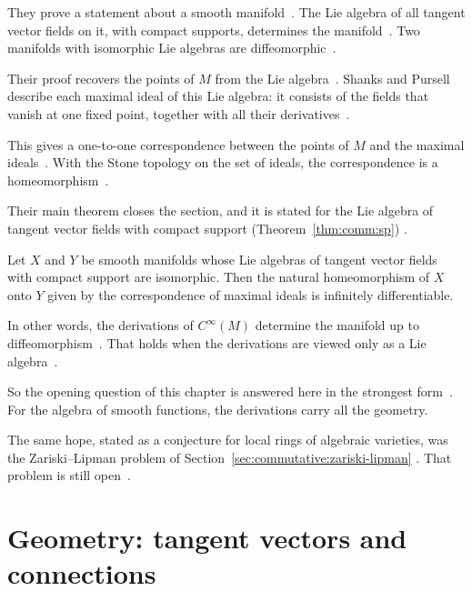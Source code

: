 They prove a statement about a smooth
manifold~\cite[p.~468]{ShanksPursell1954}. The Lie algebra of all tangent
vector fields on it, with compact supports, determines the
manifold~\cite[p.~468]{ShanksPursell1954}. Two manifolds with isomorphic Lie
algebras are diffeomorphic~\cite[p.~468]{ShanksPursell1954}.

Their proof recovers the points of $M$ from the Lie
algebra~\cite[p.~470]{ShanksPursell1954}. Shanks and Pursell describe each
maximal ideal of this Lie algebra: it consists of the fields that vanish at
one fixed point, together with all their
derivatives~\cite[Theorem~1, p.~470]{ShanksPursell1954}.

This gives a one-to-one correspondence between the points of $M$ and the
maximal ideals~\cite[Theorem~2, p.~471]{ShanksPursell1954}. With the Stone
topology on the set of ideals, the correspondence is a
homeomorphism~\cite[Theorem~2, p.~471]{ShanksPursell1954}.

Their main theorem closes the section, and it is stated for the Lie algebra of
tangent vector fields with compact support (Theorem~\ref{thm:comm:sp})
\cite[Theorem~3, p.~471]{ShanksPursell1954}.\begin{theorem}\label{thm:comm:sp}
Let $X$ and $Y$ be smooth manifolds whose Lie algebras of tangent vector
fields with compact support are isomorphic. Then the natural homeomorphism of
$X$ onto $Y$ given by the correspondence of maximal ideals is infinitely
differentiable.
\end{theorem}

In other words, the derivations of $C^\infty(M)$ determine the manifold up to
diffeomorphism~\cite[Theorem~3, p.~471]{ShanksPursell1954}. That holds when
the derivations are viewed only as a Lie algebra~\cite[Theorem~3,
p.~471]{ShanksPursell1954}.

So the opening question of this chapter is answered here in the strongest
form~\cite[Theorem~3, p.~471]{ShanksPursell1954}. For the algebra of smooth
functions, the derivations carry all the geometry.

The same hope, stated as a conjecture for local rings of algebraic varieties,
was the Zariski--Lipman problem of
Section~\ref{sec:commutative:zariski-lipman}
\cite[p.~270]{BiswasGurjarKolte2014}. That problem is still
open~\cite[p.~270]{BiswasGurjarKolte2014}.

\section{Geometry: tangent vectors and connections}\label{sec:commutative:geometry}

